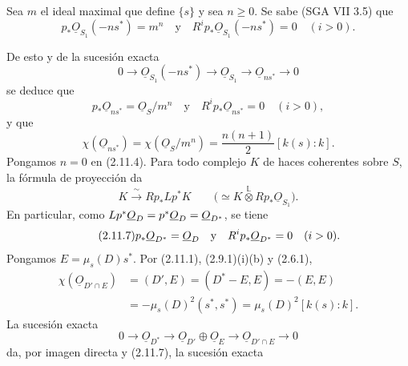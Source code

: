 Sea $m$ el ideal maximal que define $\{s\}$ y sea $n\geq0$. Se sabe (SGA VII
3.5) que
\begin{equation}\tag{2.11.4}
p_*\underline{O}_{S_1}(-ns^*)=m^n
\quad\text{y}\quad
R^ip_*\underline{O}_{S_1}(-ns^*)=0\quad(i>0).
\end{equation}

\pageoriginale

De esto y de la sucesión exacta
\begin{equation*}
0\longrightarrow\underline{O}_{S_1}(-ns^*)
\longrightarrow\underline{O}_{S_1}
\longrightarrow\underline{O}_{ns^*}
\longrightarrow0
\end{equation*}
se deduce que
\begin{equation}\tag{2.11.5}
p_*\underline{O}_{ns^*}=\underline{O}_S/m^n
\quad\text{y}\quad
R^ip_*\underline{O}_{ns^*}=0\quad(i>0),
\end{equation}
y que
\begin{equation}\tag{2.11.6}
\chi(\underline{O}_{ns^*})
=\chi(\underline{O}_S/m^n)
=\frac{n(n+1)}2[k(s):k].
\end{equation}
Pongamos $n=0$ en (2.11.4). Para todo complejo $K$ de haces coherentes sobre
$S$, la fórmula de proyección da
\begin{equation*}
K\xrightarrow{\;\sim\;}Rp_*Lp^*K
\qquad
\bigl(\simeq K\overset{\mathbb L}{\otimes}Rp_*\underline{O}_{S_1}\bigr).
\end{equation*}
En particular, como
$L\sisi{f}{p}^*\underline{O}_D=\sisi{f}{p}^*\underline{O}_D=
\underline{O}_{D^*}$, se tiene
\begin{equation}\tag{2.11.7}
\sisi{f}{p}_*\underline{O}_{D^*}=\underline{O}_D
\quad\text{y}\quad
R^i\sisi{f}{p}_*\underline{O}_{D^*}=0\quad(i>0).
\end{equation}
Pongamos $E=\mu_s(D)s^*$. Por (2.11.1), (2.9.1)(i)(b) y (2.6.1),
\begin{equation}\tag{2.11.8}
\begin{aligned}
\chi(\underline{O}_{D'\cap E})
&=(D',E)=(D^*-E,E)=-(E,E)\\
&=-\mu_s(D)^2(s^*,s^*)
=\mu_s(D)^2[k(s):k].
\end{aligned}
\end{equation}
La sucesión exacta
\begin{equation*}
0\longrightarrow\underline{O}_{D^*}
\longrightarrow\underline{O}_{D'}\oplus\underline{O}_E
\longrightarrow\underline{O}_{D'\cap E}
\longrightarrow0
\end{equation*}
da, por imagen directa y (2.11.7), la sucesión exacta
